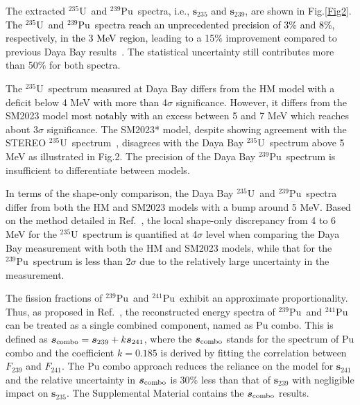 \documentclass[aps,prl,showpacs,showkeys,amsmath,amssymb,twocolumn,floatfix,superscriptaddress,nofootinbib]{revtex4-1}
\newcommand{\black}{\textcolor{black}}
\newcommand{\Ufive}{$\mathrm{^{235}U}$}
\newcommand{\Punine}{$\mathrm{^{239}Pu}$}
\newcommand{\Puone}{$\mathrm{^{241}Pu}$}
\begin{document}
The extracted \Ufive\ and \Punine\ spectra, i.e., $\bm{s}_{235}$ and $\bm{s}_{239}$, are shown in Fig.\ref{Fig2}.
\black{The \Ufive\ and \Punine\ spectra reach an unprecedented precision of 3\% and 8\%, respectively, in the 3 MeV region,} leading to a 15$\%$ improvement compared to previous Daya Bay results~\cite{DayaBay_PRL_extraction}.
The statistical uncertainty still contributes more than 50\% for both spectra.

The \Ufive\ spectrum measured at Daya Bay differs from the HM model \black{with} a deficit below 4 MeV with more than 4$\sigma$ significance.
However, it differs from the SM2023 model \black{most notably with} an excess between 5 and 7 MeV which reaches about 3$\sigma$ significance.
The SM2023* model, despite showing agreement with the STEREO \Ufive\ spectrum~\cite{Stereo_Nature}, disagrees with the Daya Bay \Ufive\ spectrum above 5 MeV as illustrated in Fig.2.
The precision of the Daya Bay \Punine\ spectrum is insufficient to differentiate between models.

In terms of the shape-only comparison, the Daya Bay \Ufive\ and \Punine\ spectra differ from both the HM and SM2023 models with a bump around 5 MeV.
Based on the method detailed in Ref.~\cite{DayaBay_CPC_2016, DayaBay_PRL_extraction}, the local shape-only discrepancy from 4 to 6 MeV for the \Ufive\ spectrum is quantified at 4$\sigma$ level when comparing the Daya Bay measurement with both the HM and SM2023 models, while that for the \Punine\ spectrum is less than 2$\sigma$ due to the relatively large uncertainty in the measurement.




The fission fractions of \Punine\ and \Puone\ exhibit an approximate proportionality.
Thus, as proposed in Ref.~\cite{DayaBay_PRL_extraction}, the reconstructed energy spectra of \Punine\ and \Puone\, can be treated as a single combined component, named as Pu combo.
This is defined as $\bm{s}_{\rm{combo}} = \bm{s}_{239} + k \bm{s}_{241}$, where the $\bm{s}_{\rm{combo}}$ stands for the spectrum of Pu combo and the coefficient $k = 0.185$ is derived by fitting the correlation between $F_{239}$ and $F_{241}$.
The Pu combo approach reduces the reliance on the model for $\bm{s}_{241}$ and the relative uncertainty in $\bm{s}_{\rm{combo}}$ is 30\% less than that of $\bm{s}_{239}$ with negligible impact on $\bm{s}_{235}$.
The Supplemental Material contains the $\bm{s}_{\rm{combo}}$ results.
\end{document}
